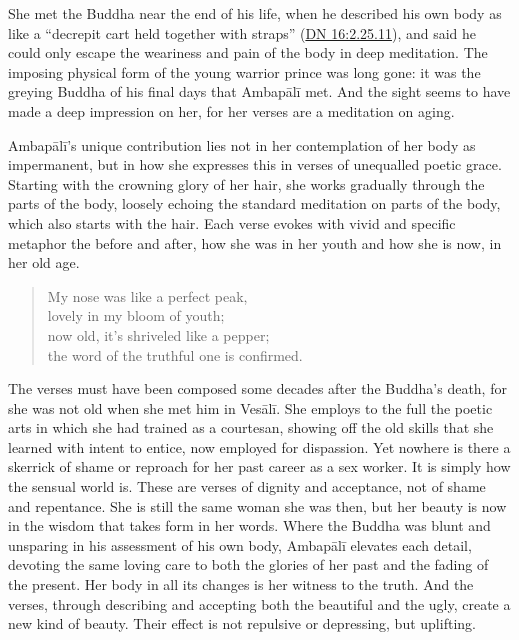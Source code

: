 \documentclass[12pt,openany]{book}%
\begin{document}
She met the Buddha near the end of his life, when he described his own body as like a “decrepit cart held together with straps” (\href{https://suttacentral.net/dn16/en/sujato\#2.25.11}{DN 16:2.25.11}), and said he could only escape the weariness and pain of the body in deep meditation. The imposing physical form of the young warrior prince was long gone: it was the greying Buddha of his final days that \textsanskrit{Ambapālī} met. And the sight seems to have made a deep impression on her, for her verses are a meditation on aging.

\textsanskrit{Ambapālī}’s unique contribution lies not in her contemplation of her body as impermanent, but in how she expresses this in verses of unequalled poetic grace. Starting with the crowning glory of her hair, she works gradually through the parts of the body, loosely echoing the standard meditation on parts of the body, which also starts with the hair. Each verse evokes with vivid and specific metaphor the before and after, how she was in her youth and how she is now, in her old age. 

\begin{quotation}%
My nose was like a perfect peak, \\
lovely in my bloom of youth; \\
now old, it’s shriveled like a pepper; \\
the word of the truthful one is confirmed.

%
\end{quotation}

The verses must have been composed some decades after the Buddha’s death, for she was not old when she met him in \textsanskrit{Vesālī}. She employs to the full the poetic arts in which she had trained as a courtesan, showing off the old skills that she learned with intent to entice, now employed for dispassion. Yet nowhere is there a skerrick of shame or reproach for her past career as a sex worker. It is simply how the sensual world is. These are verses of dignity and acceptance, not of shame and repentance. She is still the same woman she was then, but her beauty is now in the wisdom that takes form in her words. Where the Buddha was blunt and unsparing in his assessment of his own body, \textsanskrit{Ambapālī} elevates each detail, devoting the same loving care to both the glories of her past and the fading of the present. Her body in all its changes is her witness to the truth. And the verses, through describing and accepting both the beautiful and the ugly, create a new kind of beauty. Their effect is not repulsive or depressing, but uplifting.
\end{document}
